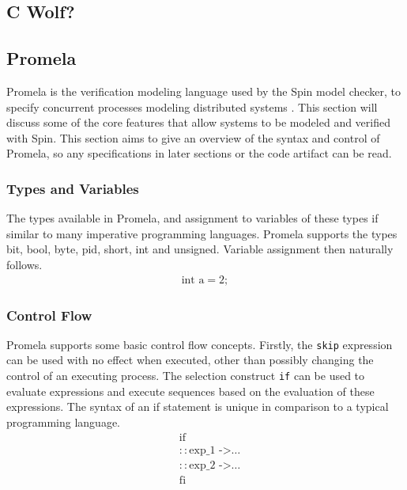 \subsection{C Wolf?}
\subsection{Promela} \label{sec:promela}
Promela is the verification modeling language used by the Spin model checker, to specify concurrent processes modeling distributed systems \cite{spin}. This section will discuss some of the core features that allow systems to be modeled and verified with Spin. This section aims to give an overview of the syntax and control of Promela, so any specifications in later sections or the code artifact can be read.
\subsubsection[]{Types and Variables}
The types available in Promela, and assignment to variables of these types if similar to many imperative programming languages. Promela supports the types bit, bool, byte, pid, short, int and unsigned. Variable assignment then naturally follows.
\[
\begin{aligned}
\text{int a} = 2;
\end{aligned}
\]
\subsubsection[]{Control Flow}
Promela supports some basic control flow concepts. Firstly, the \texttt{skip} expression can be used with no effect when executed, other than possibly changing the control of an executing process. The selection construct \texttt{if} can be used to evaluate expressions and execute sequences based on the evaluation of these expressions. The syntax of an if statement is unique in comparison to a typical programming language.
\[
\begin{aligned}
& \text{if} \\
& :: \text{exp\_1 ->} \dots \\
& :: \text{exp\_2 ->} \dots \\
& \text{fi} \\
\end{aligned}    
\]

